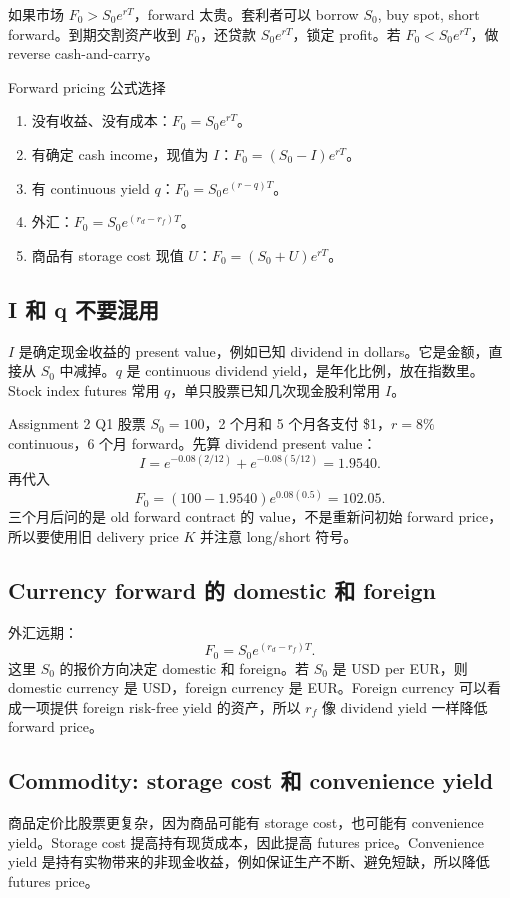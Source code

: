 如果市场 $F_0>S_0e^{rT}$，forward 太贵。套利者可以 borrow $S_0$, buy spot, short forward。到期交割资产收到 $F_0$，还贷款 $S_0e^{rT}$，锁定 profit。若 $F_0<S_0e^{rT}$，做 reverse cash-and-carry。

\begin{workflowbox}{Forward pricing 公式选择}
\begin{enumerate}
  \item 没有收益、没有成本：$F_0=S_0e^{rT}$。
  \item 有确定 cash income，现值为 $I$：$F_0=(S_0-I)e^{rT}$。
  \item 有 continuous yield $q$：$F_0=S_0e^{(r-q)T}$。
  \item 外汇：$F_0=S_0e^{(r_d-r_f)T}$。
  \item 商品有 storage cost 现值 $U$：$F_0=(S_0+U)e^{rT}$。
\end{enumerate}
\end{workflowbox}

\subsection{I 和 q 不要混用}
$I$ 是确定现金收益的 present value，例如已知 dividend in dollars。它是金额，直接从 $S_0$ 中减掉。$q$ 是 continuous dividend yield，是年化比例，放在指数里。Stock index futures 常用 $q$，单只股票已知几次现金股利常用 $I$。

\begin{examplebox}{Assignment 2 Q1}
股票 $S_0=100$，2 个月和 5 个月各支付 \$1，$r=8\%$ continuous，6 个月 forward。先算 dividend present value：
\[
I=e^{-0.08(2/12)}+e^{-0.08(5/12)}=1.9540.
\]
再代入
\[
F_0=(100-1.9540)e^{0.08(0.5)}=102.05.
\]
三个月后问的是 old forward contract 的 value，不是重新问初始 forward price，所以要使用旧 delivery price $K$ 并注意 long/short 符号。
\end{examplebox}

\subsection{Currency forward 的 domestic 和 foreign}
外汇远期：
\[
F_0=S_0e^{(r_d-r_f)T}.
\]
这里 $S_0$ 的报价方向决定 domestic 和 foreign。若 $S_0$ 是 USD per EUR，则 domestic currency 是 USD，foreign currency 是 EUR。Foreign currency 可以看成一项提供 foreign risk-free yield 的资产，所以 $r_f$ 像 dividend yield 一样降低 forward price。

\subsection{Commodity: storage cost 和 convenience yield}
商品定价比股票更复杂，因为商品可能有 storage cost，也可能有 convenience yield。Storage cost 提高持有现货成本，因此提高 futures price。Convenience yield 是持有实物带来的非现金收益，例如保证生产不断、避免短缺，所以降低 futures price。

